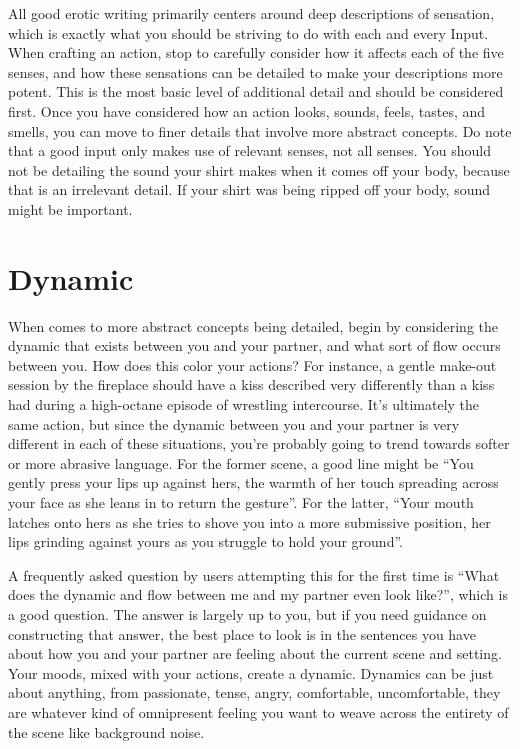\documentclass[Source-main.tex]{subfiles}
\begin{document}
All good erotic writing primarily centers around deep descriptions of sensation, which is exactly what you should be striving to do with each and every Input.
When crafting an action, stop to carefully consider how it affects each of the five senses, and how these sensations can be detailed to make your descriptions more potent.
This is the most basic level of additional detail and should be considered first.
Once you have considered how an action looks, sounds, feels, tastes, and smells, you can move to finer details that involve more abstract concepts.
Do note that a good input only makes use of relevant senses, not all senses.
You should not be detailing the sound your shirt makes when it comes off your body, because that is an irrelevant detail.
If your shirt was being ripped off your body, sound might be important.

\section{Dynamic}

When comes to more abstract concepts being detailed, begin by considering the dynamic that exists between you and your partner, and what sort of flow occurs between you.
How does this color your actions? For instance, a gentle make-out session by the fireplace should have a kiss described very differently than a kiss had during a high-octane episode of wrestling intercourse.
It’s ultimately the same action, but since the dynamic between you and your partner is very different in each of these situations, you’re probably going to trend towards softer or more abrasive language.
For the former scene, a good line might be “You gently press your lips up against hers, the warmth of her touch spreading across your face as she leans in to return the gesture”.
For the latter, “Your mouth latches onto hers as she tries to shove you into a more submissive position, her lips grinding against yours as you struggle to hold your ground”.

A frequently asked question by users attempting this for the first time is “What does the dynamic and flow between me and my partner even look like?”, which is a good question.
The answer is largely up to you, but if you need guidance on constructing that answer, the best place to look is in the \rem sentences you have about how you and your partner are feeling about the current scene and setting.
Your moods, mixed with your actions, create a dynamic.
Dynamics can be just about anything, from passionate, tense, angry, comfortable, uncomfortable, they are whatever kind of omnipresent feeling you want to weave across the entirety of the scene like background noise.
\end{document}
